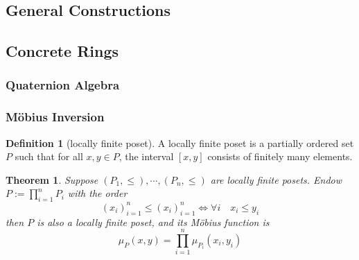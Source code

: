 \documentclass{article}
\newtheorem{Thm}{Theorem}[section]
\theoremstyle{definition}
\newtheorem{Def}{Definition}[section]
\begin{document}
\subsection{General Constructions}


\subsection{Concrete Rings}
\subsubsection{Quaternion Algebra}

\subsubsection{M\"{o}bius Inversion}
\begin{Def}[locally finite poset]
    A locally finite poset is a partially ordered set $P$ such that for all $x,y\in P$, the interval $[x,y]$ consists of finitely many elements.
\end{Def}
\begin{Thm}
    Suppose $(P_1,\le),\cdots,(P_n,\le)$ are locally finite posets. Endow $P:=\prod_{i=1}^{n}P_i$ with the order \[(x_i)_{i=1}^n\le (x_i)_{i=1}^n\Longleftrightarrow \forall i\quad x_i\le y_i\]
    then $P$ is also a locally finite poset, and its M\"{o}bius function is \[\mu_P(x,y)=\prod_{i=1}^n\mu_{P_i}(x_i,y_i)\]
\end{Thm}
\end{document}
